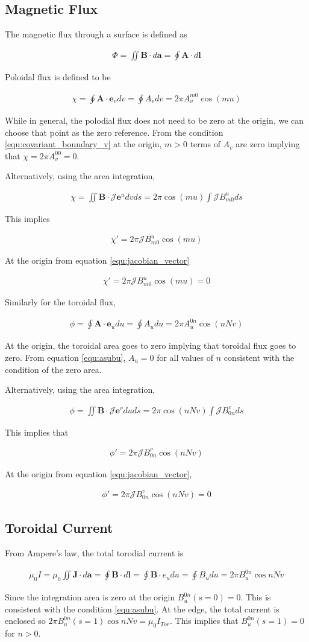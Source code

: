 \documentclass[11pt]{article}
\newcommand{\brackets}[1]{\left(#1\right)}
\renewcommand{\vec}[1]{\boldsymbol#1}
\newcommand{\co}[1]{\vec{e}_{#1}}
\newcommand{\con}[1]{\vec{e}^{#1}}
\newcommand{\equ}[2]{
	\begin{equation}
    \begin{split}
	#1
	\label{#2}
	\end{split}
	\end{equation}
}
\newcommand{\dotp}[2]{#1\cdot#2}
\begin{document}
\subsection{Magnetic Flux}
The magnetic flux through a surface is defined as 
\equ{
\Phi=\iint\dotp{\vec{B}}{d\vec{a}}=\oint\dotp{\vec{A}}{d\vec{l}}
}{equ:magnetic_flux}
Poloidal flux is defined to be
\equ{
\chi=\oint\dotp{\vec{A}}{\co{v}dv}=\oint A_{v}dv=2\pi A^{m0}_{v}\cos\brackets{mu}
}{equ:poloidal_flux}
While in general, the polodial flux does not need to be zero at the origin, we can choose that point as the zero reference.
From the condition \ref{equ:covariant_boundary_v} at the origin, $m>0$ terms of $A_{v}$ are zero implying that $\chi=2\pi A^{00}_{v}=0$.

Alternatively, using the area integration,
\equ{
\chi=\iint\dotp{\vec{B}}{\mathcal{J}\con{u}dvds}=2\pi\cos\brackets{mu}\int\mathcal{J}B_{m0}^{u}ds
}{equ:poloidal_flux_area}
This implies 
\equ{
\chi'=2\pi\mathcal{J}B_{m0}^{u}\cos\brackets{mu}
}{equ:poloidal_flux_prime}
At the origin from equation \ref{equ:jacobian_vector}
\equ{
\chi'=2\pi\mathcal{J}B_{m0}^{u}\cos\brackets{mu}=0
}{equ:poloidal_flux_prime_origin}

Similarly for the toroidal flux, 
\equ{
\phi=\oint\dotp{\vec{A}}{\co{u}du}=\oint A_{u}du=2\pi A^{0n}_{u}\cos\brackets{nNv}
}{equ:toroidal_flux}
At the origin, the toroidal area goes to zero implying that toroidal flux goes to zero.
From equation \ref{equ:asubu}, $A_u=0$ for all values of $n$ consistent with the condition of the zero area.

Alternatively, using the area integration,
\equ{
\phi=\iint\dotp{\vec{B}}{\mathcal{J}\con{v}duds}=2\pi\cos\brackets{nNv}\int\mathcal{J}B_{0n}^{v}ds
}{equ:toroidal_flux_area}
This implies that
\equ{
\phi'=2\pi\mathcal{J}B_{0n}^{v}\cos\brackets{nNv}
}{equ:toroidal_flux_prime}
At the origin from equation \ref{equ:jacobian_vector},
\equ{
\phi'=2\pi\mathcal{J}B_{0n}^{v}\cos\brackets{nNv}=0
}{equ:toroidal_flux_prime_origin}

\subsection{Toroidal Current}
From Ampere's law, the total torodial current is 
\equ{
\mu_{0}I=\mu_{0}\iint\dotp{\vec{J}}{d\vec{a}}=\oint\dotp{\vec{B}}{d\vec{l}}=\oint\dotp{\vec{B}}{e_{u}du}=\oint B_{u}du=2\pi B^{0n}_{u}\cos{nNv}
}{equ:amperes_law}
Since the integration area is zero at the origin $B^{0n}_{u}\brackets{s=0}=0$.
This is consistent with the condition \ref{equ:asubu}.
At the edge, the total current is enclosed so $2\pi B^{0n}_{u}\brackets{s=1}\cos{nNv}=\mu_{0}I_{Tor}$.
This implies that $B^{0n}_{u}\brackets{s=1}=0$ for $n>0$.
\end{document}
